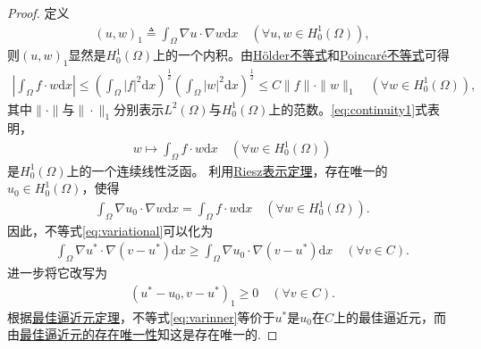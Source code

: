 \documentclass[../../main.tex]{subfiles}%
\begin{document}
\begin{proof}

定义
\begin{align*}
(u,w)_1\triangleq\int_\Omega \nabla u\cdot\nabla w\mathrm{d}x\quad (\forall u,w\in H_0^1(\Omega)),
\end{align*}
则$(u,w)_1$显然是$H_0^1(\Omega)$上的一个内积。由\hyperref[Real-Analysis-theorem:实变函数--Hölder不等式]{Hölder不等式}和\hyperref[lemma:(庞加莱)Poincaré不等式]{Poincaré不等式}可得
\begin{align}
\left|\int_\Omega f\cdot w\mathrm{d}x\right|\leqslant\left(\int_\Omega |f|^2\mathrm{d}x\right)^{\frac{1}{2}}\left(\int_\Omega |w|^2\mathrm{d}x\right)^{\frac{1}{2}}
\leqslant C\|f\|\cdot\|w\|_1\quad (\forall w\in H_0^1(\Omega)),
\label{eq:continuity1}
\end{align}
其中$\|\cdot\|$与$\|\cdot\|_1$分别表示$L^2(\Omega)$与$H_0^1(\Omega)$上的范数。\eqref{eq:continuity1}式表明，
\begin{align*}
w\mapsto\int_\Omega f\cdot w\mathrm{d}x\quad (\forall w\in H_0^1(\Omega))
\end{align*}
是$H_0^1(\Omega)$上的一个连续线性泛函。
利用\hyperref[theorem:Riesz表示定理(Hilbert空间)]{Riesz表示定理}，存在唯一的$u_0\in H_0^1(\Omega)$，使得
\begin{align}
\int_\Omega \nabla u_0\cdot\nabla w\mathrm{d}x=\int_\Omega f\cdot w\mathrm{d}x\quad (\forall w\in H_0^1(\Omega)).
\label{eq:rieszvar}
\end{align}
因此，不等式\eqref{eq:variational}可以化为
\begin{align*}
\int_\Omega \nabla u^*\cdot\nabla(v-u^*)\mathrm{d}x\geqslant\int_\Omega \nabla u_0\cdot\nabla(v-u^*)\mathrm{d}x\quad (\forall v\in C).
\end{align*}
进一步将它改写为
\begin{align}
(u^*-u_0,v-u^*)_1\geqslant 0\quad (\forall v\in C).
\label{eq:varinner}
\end{align}
根据\hyperref[theorem:泛函分析--最佳逼近元的刻画]{最佳逼近元定理}，不等式\eqref{eq:varinner}等价于$u^*$是$u_0$在$C$上的最佳逼近元，而由\hyperref[corollary:泛函分析--最佳逼近元的存在唯一性]{最佳逼近元的存在唯一性}知这是存在唯一的.

\end{proof}
\end{document}
